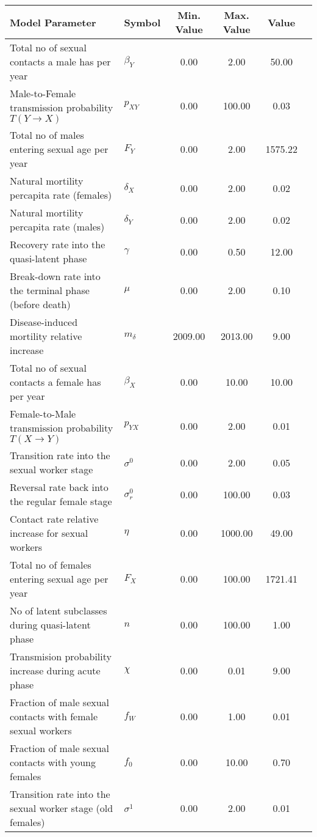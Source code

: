 \begin{table}
\centering
\begin{tabular}{p{5cm}lcccc}
{\bf Model Parameter} & {\bf Symbol} & {\bf Min. Value} & {\bf Max. Value} & {\bf Value}\\
\hline\hline
Total no of sexual contacts a male has per year & $\beta_Y$ & 0.00 & 2.00 & 50.00\\
Male-to-Female transmission probability $T(Y\rightarrow X)$ & $p_{XY}$ & 0.00 & 100.00 & 0.03\\
Total no of males entering sexual age per year & $F_Y$ & 0.00 & 2.00 & 1575.22\\
Natural mortility percapita rate (females) & $\delta_X$ & 0.00 & 2.00 & 0.02\\
Natural mortility percapita rate (males) & $\delta_Y$ & 0.00 & 2.00 & 0.02\\
Recovery rate into the quasi-latent phase & $\gamma$ & 0.00 & 0.50 & 12.00\\
Break-down rate into the terminal phase (before death) & $\mu$ & 0.00 & 2.00 & 0.10\\
Disease-induced mortility relative increase & $m_{\delta}$ & 2009.00 & 2013.00 & 9.00\\
Total no of sexual contacts a female has per year & $\beta_X$ & 0.00 & 10.00 & 10.00\\
Female-to-Male transmission probability $T(X\rightarrow Y)$ & $p_{YX}$ & 0.00 & 2.00 & 0.01\\
Transition rate into the sexual worker stage & $\sigma^0$ & 0.00 & 2.00 & 0.05\\
Reversal rate back into the regular female stage & $\sigma^0_r$ & 0.00 & 100.00 & 0.03\\
Contact rate relative increase for sexual workers & $\eta$ & 0.00 & 1000.00 & 49.00\\
Total no of females entering sexual age per year & $F_X$ & 0.00 & 100.00 & 1721.41\\
No of latent subclasses during quasi-latent phase & $n$ & 0.00 & 100.00 & 1.00\\
Transmision probability increase during acute phase & $\chi$ & 0.00 & 0.01 & 9.00\\
Fraction of male sexual contacts with female sexual workers & $f_W$ & 0.00 & 1.00 & 0.01\\
Fraction of male sexual contacts with young females & $f_0$ & 0.00 & 10.00 & 0.70\\
Transition rate into the sexual worker stage (old females) & $\sigma^1$ & 0.00 & 2.00 & 0.01\\

\end{tabular}
\end{table}
